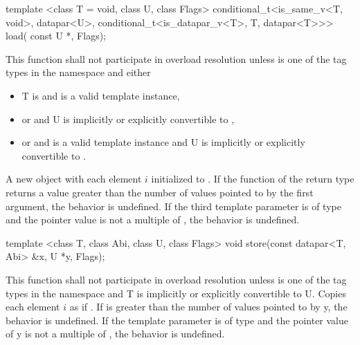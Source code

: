 \begin{itemdecl}
template <class T = void, class U, class Flags>
conditional_t<is_same_v<T, void>, datapar<U>, conditional_t<is_datapar_v<T>, T, datapar<T>>> load(
    const U *, Flags);
\end{itemdecl}
\begin{itemdescr}
  \pnum\remarks This function shall not participate in overload resolution unless  is one of the tag types in the  namespace and either
  \begin{itemize}
    \item \type T is \void and \datapar[<U>] is a valid template instance,
    \item or  and \type U is implicitly or explicitly convertible to ,
    \item or  and \datapar[<T>] is a valid template instance and \type U is implicitly or explicitly convertible to .
  \end{itemize}
  \pnum\returns A new \datapar object with each element $i$ initialized to  \foralli.
  \pnum\remarks If the  function of the return type returns a value greater than the number of values pointed to by the first argument, the behavior is undefined.
  \pnum\remarks If the third template parameter is of type  and the pointer value is not a multiple of , the behavior is undefined.
\end{itemdescr}

\begin{itemdecl}
template <class T, class Abi, class U, class Flags>
void store(const datapar<T, Abi> &x, U *y, Flags);
\end{itemdecl}
\begin{itemdescr}
  \pnum\remarks This function shall not participate in overload resolution unless  is one of the tag types in the  namespace and \type T is implicitly or explicitly convertible to \type U.
  \pnum\effects Copies each element $i$ as if  \foralli.
  \pnum\remarks If \datapar[<T, Abi>] is greater than the number of values pointed to by \code y, the behavior is undefined.
  \pnum\remarks If the  template parameter is of type  and the pointer value of \code y is not a multiple of , the behavior is undefined.
\end{itemdescr}

